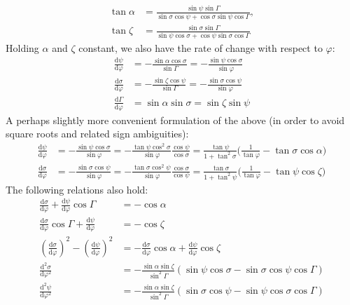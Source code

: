 \documentclass{book}
\newcommand{\phase}{\varphi}
\newcommand{\deriv}[2]{\frac{\text{d}{#1}}{\text{d}{#2}}}
\newcommand{\derivn}[3]{\frac{\text{d}^{#3}{#1}}{\text{d}{#2}^{#3}}}
\begin{document}
\begin{equation}
    \begin{aligned}
        \tan\alpha &= \frac{\sin\psi \sin\Gamma}{\sin\sigma \cos\psi + \cos\sigma \sin\psi \cos\Gamma}, \\[5pt]
        \tan\zeta  &= \frac{\sin\sigma \sin\Gamma}{\sin\psi \cos\sigma + \cos\psi \sin\sigma \cos\Gamma}
    \end{aligned}
\end{equation}
Holding $\alpha$ and $\zeta$ constant, we also have the rate of change with respect to $\phase$:
\begin{equation}
    \begin{aligned}
        \deriv{\psi}{\phase}
            &= -\frac{\sin\alpha \cos\sigma}{\sin\Gamma}
             = -\frac{\sin\psi \cos\sigma}{\sin\phase} \\[5pt]
        \deriv{\sigma}{\phase}
            &= -\frac{\sin\zeta \cos\psi}{\sin\Gamma}
             = -\frac{\sin\sigma \cos\psi}{\sin\phase} \\[5pt]
        \deriv{\Gamma}{\phase}
            &= \sin\alpha \sin\sigma
             = \sin\zeta  \sin\psi
    \end{aligned}
\end{equation}
A perhaps slightly more convenient formulation of the above (in order to avoid square roots and related sign ambiguities):
\begin{equation}
    \begin{aligned}
        \deriv{\psi}{\phase}
            &= -\frac{\sin\psi\cos\sigma}{\sin\phase}
             = -\frac{\tan\psi\cos^2\sigma}{\sin\phase}\frac{\cos\psi}{\cos\sigma}
             = \frac{\tan\psi}{1 + \tan^2\sigma}\bigg(\frac{1}{\tan\phase} - \tan\sigma\cos\alpha\bigg) \\
        \deriv{\sigma}{\phase}
            &= -\frac{\sin\sigma\cos\psi}{\sin\phase}
             = -\frac{\tan\sigma\cos^2\psi}{\sin\phase}\frac{\cos\sigma}{\cos\psi}
             = \frac{\tan\sigma}{1 + \tan^2\psi}\bigg(\frac{1}{\tan\phase} - \tan\psi\cos\zeta\bigg)
    \end{aligned}
\end{equation}
The following relations also hold:
\begin{equation}
    \begin{aligned}
        \deriv{\sigma}{\phase} + \deriv{\psi}{\phase}\cos\Gamma &= -\cos\alpha \\[5pt]
        \deriv{\sigma}{\phase}\cos\Gamma + \deriv{\psi}{\phase} &= -\cos\zeta \\[5pt]
        \left(\deriv{\sigma}{\phase}\right)^2 - \left(\deriv{\psi}{\phase}\right)^2
            &= -\deriv{\sigma}{\phase}\cos\alpha + \deriv{\psi}{\phase}\cos\zeta \\[5pt]
        \derivn{\sigma}{\phase}{2} &= -\frac{\sin\alpha\sin\zeta}{\sin^2\Gamma}(\sin\psi\cos\sigma - \sin\sigma\cos\psi\cos\Gamma)\\[5pt]
        \derivn{\psi}{\phase}{2} &= -\frac{\sin\alpha\sin\zeta}{\sin^2\Gamma}(\sin\sigma\cos\psi - \sin\psi\cos\sigma\cos\Gamma)
    \end{aligned}
\end{equation}
\end{document}
